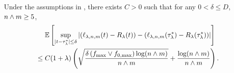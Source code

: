 \begin{lemma}\label{lemm:maximal.inequality}
Under the assumptions in ,
there exists $C > 0$ such that for any $0 < \delta \le D$, ${n} \wedge m \ge 5$,
    \begin{align}\label{lemm:eq:M.estimator}
        &\quad~\mathbb{E}\left[\sup_{|{t} - {\tau^*_\lambda}| \le \delta} \left|
        \left({{\ell}_{\lambda, {n}, m}}({t}) - {R_{\lambda}}{}({t})\right) -
        \left({{\ell}_{\lambda, {n}, m}}({\tau^*_\lambda}) - {R_{\lambda}}{}({\tau^*_\lambda})\right)
        \right|\right] \\
        &\le C (1+\lambda) \left(\sqrt{\frac{\delta \left({f_{\max}} \vee {f_{0,\max}}\right) \log({n} \wedge m)}{{n} \wedge m}} + \frac{\log({n} \wedge m)}{{n} \wedge m}\right).
    \end{align}
\end{lemma}



